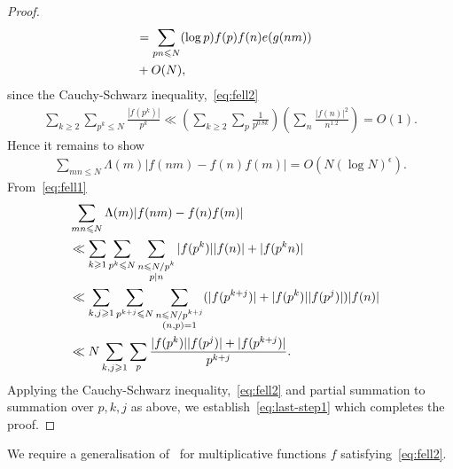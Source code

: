 \documentclass[12pt]{amsart}
\def\\{\cr}
\def\le{\leqslant}
\def\ge{\geqslant}
\begin{document}
\begin{proof}
\begin{align*}
&=\sum_{pn\le N}(\log{p})f(p) f(n)e(g(nm))\\ &+O(N),
\end{align*}
since the Cauchy-Schwarz inequality,~\eqref{eq:fell2} 
\begin{align*}
\sum_{k\ge 2}\sum_{p^{k}\le N}\frac{|f(p^{k})|}{p^{k}}\ll \left(\sum_{k\ge 2}\sum_{p}\frac{1}{p^{0.8k}} \right)\left(\sum_{n}\frac{|f(n)|^2}{n^{1.2}} \right)=O(1).
\end{align*}
Hence it remains to show 
\begin{align}
\label{eq:last-step1}
\sum_{mn\le N}\Lambda(m)|f(nm)-f(n)f(m)| =O(N(\log{N})^{\epsilon}).
\end{align}
From~\eqref{eq:fell1}
\begin{align*}
&\sum_{mn\le N}\Lambda(m)|f(nm)-f(n)f(m)| \\& \ll  \sum_{k\ge 1}\sum_{p^{k}\le N}\sum_{\substack{n\le N/p^{k} \\ p|n}}|f(p^{k})||f(n)|+|f(p^{k}n)| \\
&\ll \sum_{k,j\ge 1}\sum_{p^{k+j}\le N}\sum_{\substack{n\le N/p^{k+j} \\ (n,p)=1}}(|f(p^{k+j})|+|f(p^{k})||f(p^{j})|)|f(n)| \\
&\ll N\sum_{k,j\ge 1}\sum_{p}\frac{|f(p^{k})||f(p^{j})|+|f(p^{k+j})|}{p^{k+j}}.
\end{align*}
Applying the Cauchy-Schwarz inequality,~\eqref{eq:fell2} and partial summation to summation over $p,k,j$ as above, we establish~\eqref{eq:last-step1} which completes the proof.
\end{proof}
We require a generalisation of~\cite[Section~3]{M-V} for multiplicative functions $f$ satisfying~\eqref{eq:fell2}. 
\end{document}
